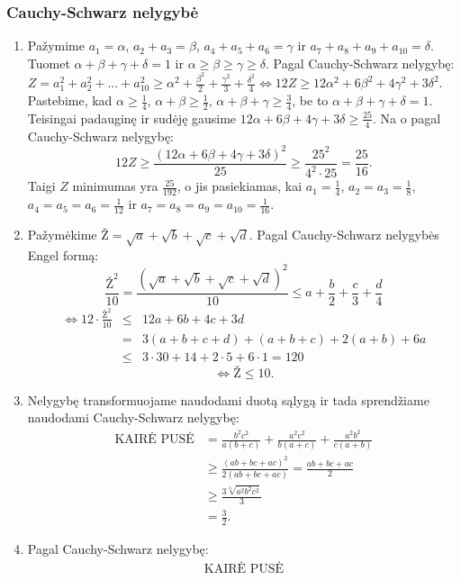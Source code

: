 \subsubsection*{Cauchy-Schwarz nelygybė}
\begin{enumerate} 
\item 
Pažymime $a_1=\alpha$, $a_2+a_3=\beta$, $a_4+a_5+a_6=\gamma$ ir
$a_7+a_8+a_9+a_{10}=\delta$. Tuomet $\alpha+\beta+\gamma+\delta=1$ ir
$\alpha\geq\beta\geq\gamma\geq\delta$. Pagal Cauchy-Schwarz nelygybę:
\\$Z=a_1^2+a_2^2+...+a_{10}^2\geq\alpha^2+\frac{\beta^2}{2}+\frac{\gamma^2}{3}+\frac{\delta^2}{4}\Leftrightarrow12Z\geq12\alpha^2+6\beta^2+4\gamma^2+3\delta^2.$
Pastebime, kad $\alpha\geq\frac{1}{4}$, $\alpha+\beta\geq\frac{1}{2}$,
$\alpha+\beta+\gamma\geq\frac{3}{4}$, be to
$\alpha+\beta+\gamma+\delta=1$. Teisingai padauginę ir sudėję gausime
$12\alpha+6\beta+4\gamma+3\delta\geq\frac{25}{4}.$ Na o pagal
Cauchy-Schwarz nelygybę:
$$12Z\geq\frac{(12\alpha+6\beta+4\gamma+3\delta)^2}{25}\geq\frac{25^2}{4^2\cdot25}=\frac{25}{16}.$$
Taigi $Z$ minimumas yra $\frac{25}{192}$, o jis pasiekiamas, kai
$a_1=\frac{1}{4}$, $a_2=a_3=\frac{1}{8}$, $a_4=a_5=a_6=\frac{1}{12}$
ir $a_7=a_8=a_9=a_{10}=\frac{1}{16}$.
\item 
Pažymėkime $\mbox{Ž} = \sqrt{a} + \sqrt{b} + \sqrt{c} + \sqrt{d}.$
Pagal Cauchy-Schwarz nelygybės Engel formą:
$$\frac{\mbox{Ž}^2}{10}=\frac{(\sqrt{a}+\sqrt{b}+\sqrt{c}+\sqrt{d})^2}{10}\leq
a+\frac{b}{2}+\frac{c}{3}+\frac{d}{4}$$
\begin{eqnarray*}\Leftrightarrow12\cdot\frac{\mbox{Ž}^2}{10}&\leq&12a+6b+4c+3d\\
&=&3(a+b+c+d)+(a+b+c)+2(a+b)+6a\\
&\leq&3\cdot30+14+2\cdot5+6\cdot1=120
\end{eqnarray*}$$\Leftrightarrow\mbox{Ž}\leq10.$$
\item 
Nelygybę transformuojame naudodami duotą sąlygą ir tada sprendžiame
naudodami Cauchy-Schwarz nelygybę: \begin{align*} \mbox{KAIRĖ
PUSĖ}&=\frac{b^2c^2}{a(b+c)}+\frac{a^2c^2}{b(a+c)}+\frac{a^2b^2}{c(a+b)}\\
&\geq\frac{(ab+bc+ac)^2}{2(ab+bc+ac)}=\frac{ab+bc+ac}{2}\\
&\geq\frac{3\sqrt[3]{a^2b^2c^2}}{3} \tag{AM-GM}\\
&=\frac{3}{2}.\end{align*}
\item 
Pagal Cauchy-Schwarz nelygybę: \begin{eqnarray*} \text{KAIRĖ PUSĖ}

\end{eqnarray*}
\end{enumerate}
